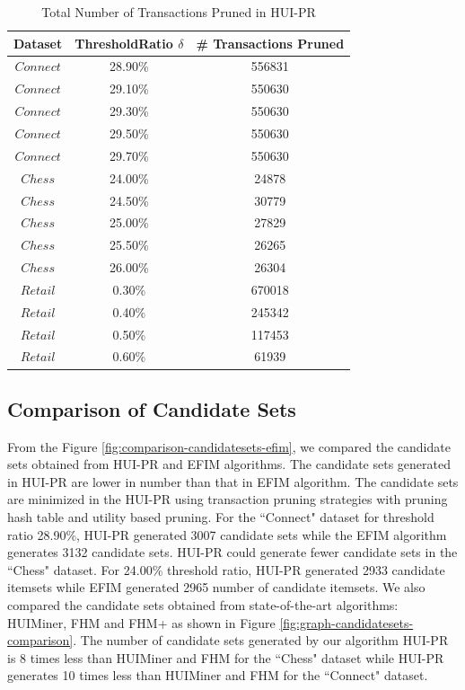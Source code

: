 \documentclass[11pt,openright]{report}
\begin{document}
\begin{table}
	\renewcommand{\arraystretch}{1.3}
	\caption{Total Number of Transactions Pruned in HUI-PR}
	\label{result_transactions_pruned}
	\centering
	\begin{tabular}{|c||c|c|}
		\hline
		\bfseries Dataset & \bfseries ThresholdRatio $\delta$ & \bfseries \# Transactions Pruned\\        \hline\hline
		
		$Connect$ & 28.90\% & 556831\\ \hline
		$Connect$ & 29.10\% & 550630\\ \hline
		$Connect$ & 29.30\% & 550630\\ \hline
		$Connect$ & 29.50\% & 550630\\ \hline
		$Connect$ & 29.70\% & 550630\\ \hline \hline
		
		$Chess$ & 24.00\% & 24878\\ \hline
		$Chess$ & 24.50\% & 30779\\ \hline
		$Chess$ & 25.00\% & 27829\\ \hline
		$Chess$ & 25.50\% & 26265\\ \hline
		$Chess$ & 26.00\% & 26304\\ \hline \hline
		
		$Retail$ & 0.30\% & 670018\\ \hline
		$Retail$ & 0.40\% & 245342\\ \hline
		$Retail$ & 0.50\% & 117453\\ \hline
		$Retail$ & 0.60\% & 61939\\ \hline
		
	\end{tabular}
\end{table}


\subsection{Comparison of Candidate Sets}
From the Figure \ref{fig:comparison-candidatesets-efim}, we compared the candidate sets obtained from HUI-PR and EFIM algorithms. The candidate sets generated in HUI-PR are lower in number than that in EFIM algorithm. The candidate sets are minimized in the HUI-PR using transaction pruning strategies with pruning hash table and utility based pruning. For the ``Connect" dataset for threshold ratio 28.90\%, HUI-PR generated 3007 candidate sets while the EFIM algorithm generates 3132 candidate sets. HUI-PR could generate fewer candidate sets in the ``Chess" dataset. For 24.00\% threshold ratio, HUI-PR generated 2933 candidate itemsets while EFIM generated 2965 number of candidate itemsets. We also compared the candidate sets obtained from state-of-the-art algorithms: HUIMiner, FHM and FHM+ as shown in Figure \ref{fig:graph-candidatesets-comparison}. The number of candidate sets generated by our algorithm HUI-PR is 8 times less than HUIMiner and FHM for the ``Chess" dataset while HUI-PR generates 10 times less than HUIMiner and FHM for the ``Connect" dataset.
\end{document}
